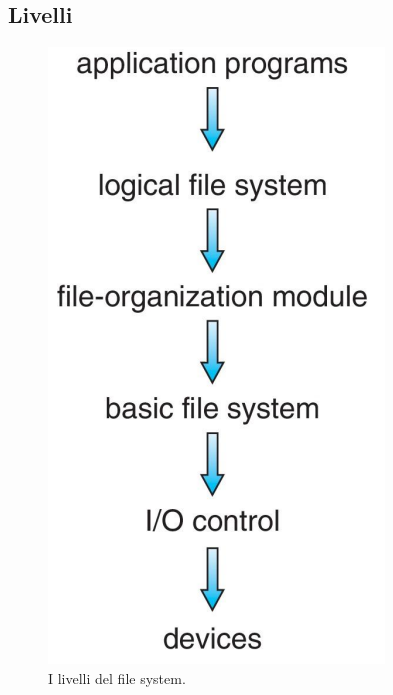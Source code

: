 \subsection{Livelli}\label{layers}
\begin{figure}
  \includegraphics[width = \linewidth]{../res/imgs/file system implementation/file system layers.png}
  \caption{I livelli del file system.}
  \label{fig:file system layers}
\end{figure}
